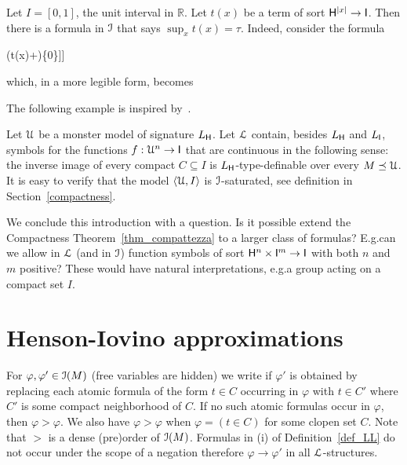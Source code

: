 \documentclass[10pt,oneside]{amsproc}
\def\dotminus{\stackon[.2ex]{$-$}{$.$}}
\renewcommand*{\emph}[1]{%
   \smash{\tikz[baseline]\node[rectangle, fill=teal!25, rounded corners, inner xsep=0.5ex, inner ysep=0.2ex, anchor=base, minimum height = 2.7ex]{\strut #1};}}
\def\forallH{\forall}
\def\existsH{\exists}
\def\forallI{\forall}
\begin{document}
\begin{example}\label{ex_Rvlogic}
  Let $I=[0,1]$, the unit interval in $\mathds{R}$.
  Let $t(x)$ be a term of sort ${\sf H}^{|x|}\to {\sf I}$.
  Then there is a formula in ${\EuScript I}$ that says $\sup_{x} t(x)=\tau$.
  Indeed, consider the formula

  \ceq{\hfill\forallH x\ \big[t(x)\dotminus\tau\in\{0\}\big]}
  {\wedge}{\forallI \varepsilon \Big[\varepsilon\in\{0\}\ \vee\ \existsH x\ \big[\tau\dotminus (t(x)+\varepsilon)\in\{0\}\big]\Big]}

  which, in a more legible form, becomes

  \ceq{\hfill\forallH x\ \big[t(x)\le\tau\big]}{\wedge}{\forallI \varepsilon>0\ \existsH x\ \big[\tau\le t(x)+ \varepsilon\big].}
\end{example}

The following example is inspired by~\cite{HPP}.

\begin{example}\label{ex_HPP}
  Let ${\EuScript U}$ be a monster model of signature $L_{\sf H}$.
  Let ${\EuScript L}$ contain, besides $L_{\sf H}$ and $L_{\sf I}$, symbols for the functions $f:{\EuScript U}^n\to{\sf I}$ that are continuous in the following sense: the inverse image of every compact $C\subseteq I$ is $L_{\sf H}$-type-definable over every $M\preceq{\EuScript U}$.
  It is easy to verify that the model $\langle{\EuScript U}, I\rangle$ is ${\EuScript I}$-saturated, see definition in Section~\ref{compactness}.
\end{example}


We conclude this introduction with a question.
Is it possible extend the Compactness Theorem~\ref{thm_compattezza} to a larger class of formulas?
E.g.\@ can we allow in ${\EuScript L}$ (and in ${\EuScript I}$) function symbols of sort ${\sf H}^n\times {\sf I}^m\to {\sf I}$ with both $n$ and $m$ positive?
These would have natural interpretations, e.g.\@ a group acting on a compact set $I$.

\section{Henson-Iovino approximations}\label{ultrapws}


For $\varphi,\varphi'\in{\EuScript I}(M)$ (free variables are hidden) we write \emph{$\varphi'>\varphi$\/} if $\varphi'$ is obtained by replacing each atomic formula of the form $t\in C$ occurring in $\varphi$ with $t\in C'$ where $C'$ is some compact neighborhood of $C$.
If no such atomic formulas occur in $\varphi$, then $\varphi>\varphi$.
We also have $\varphi>\varphi$ when $\varphi=(t\in C)$ for some clopen set $C$.
Note that $>$ is a dense (pre)order of ${\EuScript I}(M)$.
Formulas in (i) of Definition~\ref{def_LL} do not occur under the scope of a negation therefore $\varphi\to\varphi'$ in all ${\EuScript L}$-structures.
\end{document}
